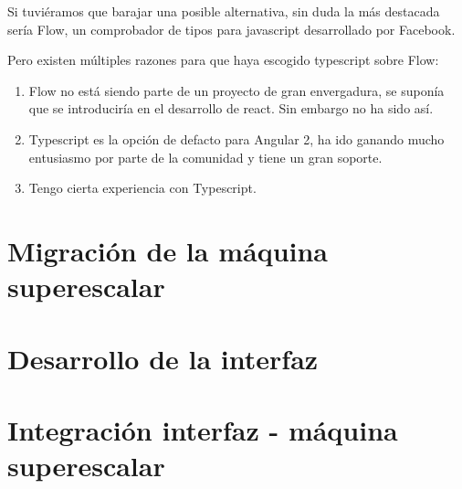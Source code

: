 Si tuviéramos que barajar una posible alternativa, sin duda la más destacada sería Flow, un comprobador de tipos para javascript desarrollado por Facebook. 

Pero existen múltiples razones para que haya escogido typescript sobre Flow:
\begin{enumerate}
\item Flow no está siendo parte de un proyecto de gran envergadura, se suponía que se introduciría en el desarrollo de react. Sin embargo no ha sido así.

\item Typescript es la opción de defacto para Angular 2, ha ido ganando mucho entusiasmo por parte de la comunidad y tiene un gran soporte.

\item Tengo cierta experiencia con Typescript.

\end{enumerate}

\section{Migración de la máquina superescalar}
\label{5:sec2} 



\section{Desarrollo de la interfaz}
\label{5:sec3} 

\section{Integración interfaz - máquina superescalar}
\label{5:sec3} 


